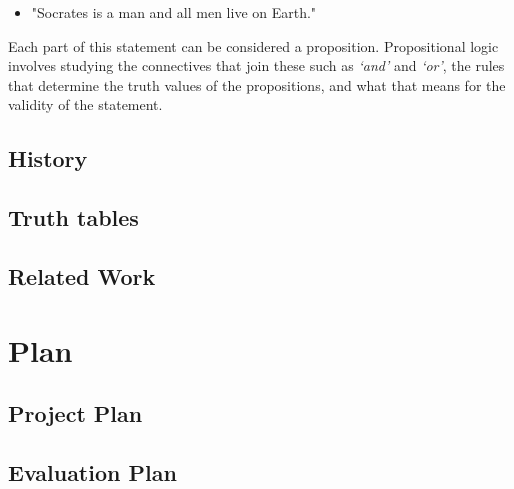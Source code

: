 \documentclass{report}
\begin{document}
\begin{itemize}
\item "Socrates is a man and all men live on Earth."
\end{itemize}
Each part of this statement can be considered a proposition. Propositional logic involves studying the connectives that join these such as \textit{`and'} and \textit{`or'}, the rules that determine the truth values of the propositions, and what that means for the validity of the statement.
  

\section{History}

\section{Truth tables}



\section{Related Work}



\chapter{Plan}



\section{Project Plan}



\section{Evaluation Plan}
\end{document}
